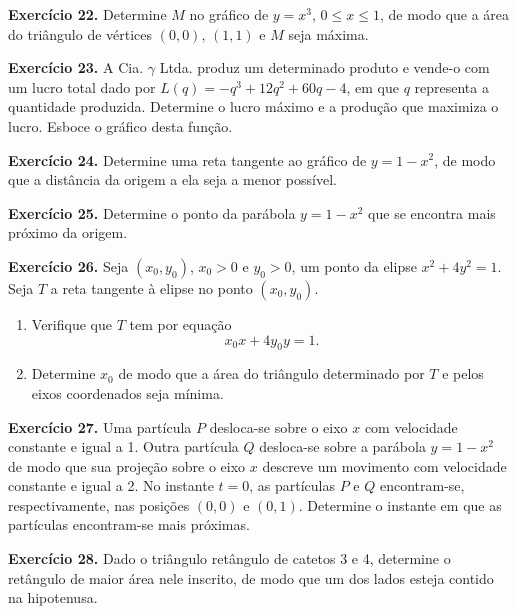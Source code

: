 \documentclass[12pt,a4paper]{article}
\begin{document}
\vspace{0.5cm}
\noindent\textbf{Exercício 22.} Determine $M$ no gráfico de $y = x^3$, $0 \le x \le 1$, de modo que a área do triângulo de vértices $(0, 0)$, $(1, 1)$ e $M$ seja máxima.

\vspace{0.5cm}
\noindent\textbf{Exercício 23.} A Cia. $\gamma$ Ltda. produz um determinado produto e vende-o com um lucro total dado por $L(q) = -q^3 + 12q^2 + 60q - 4$, em que $q$ representa a quantidade produzida. Determine o lucro máximo e a produção que maximiza o lucro. Esboce o gráfico desta função.

\vspace{0.5cm}
\noindent\textbf{Exercício 24.} Determine uma reta tangente ao gráfico de $y = 1 - x^2$, de modo que a distância da origem a ela seja a menor possível.

\vspace{0.5cm}
\noindent\textbf{Exercício 25.} Determine o ponto da parábola $y = 1 - x^2$ que se encontra mais próximo da origem.

\vspace{0.5cm}
\noindent\textbf{Exercício 26.} Seja $(x_0, y_0)$, $x_0 > 0$ e $y_0 > 0$, um ponto da elipse $x^2 + 4y^2 = 1$. Seja $T$ a reta tangente à elipse no ponto $(x_0, y_0)$.
\begin{enumerate}
    \renewcommand{\theenumi}{\alph{enumi}}
    \renewcommand{\labelenumi}{\theenumi)}
    \item Verifique que $T$ tem por equação
    \[
    x_0 x + 4y_0 y = 1.
    \]
    \item Determine $x_0$ de modo que a área do triângulo determinado por $T$ e pelos eixos coordenados seja mínima.
\end{enumerate}

\vspace{0.5cm}
\noindent\textbf{Exercício 27.} Uma partícula $P$ desloca-se sobre o eixo $x$ com velocidade constante e igual a 1. Outra partícula $Q$ desloca-se sobre a parábola $y = 1 - x^2$ de modo que sua projeção sobre o eixo $x$ descreve um movimento com velocidade constante e igual a 2. No instante $t = 0$, as partículas $P$ e $Q$ encontram-se, respectivamente, nas posições $(0, 0)$ e $(0, 1)$. Determine o instante em que as partículas encontram-se mais próximas.

\vspace{0.5cm}
\noindent\textbf{Exercício 28.} Dado o triângulo retângulo de catetos 3 e 4, determine o retângulo de maior área nele inscrito, de modo que um dos lados esteja contido na hipotenusa.
\end{document}
